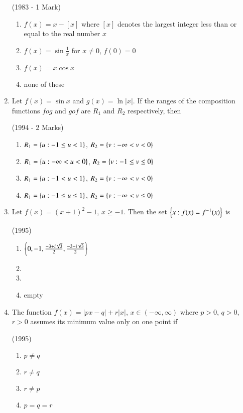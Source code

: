 \documentclass[journal,12pt,twocolumn]{IEEEtran}
\theoremstyle{remark}
\begin{document}
\begin{enumerate}
\hfill{(1983 - 1 Mark)}

\begin{enumerate}
\item $f(x)=x-\left[x\right]$ where $\left[x\right]$ denotes the largest integer less than or equal to the real number $x$
\item $f(x)=\sin{\frac{1}{x}}$ for $x\neq0$, $f(0)=0$
\item $f(x)=x\cos{x}$
\item none of these
\end{enumerate}

\item Let $f(x)=\sin{x}$ and $g(x)=\ln{|x|}$. If the ranges of the composition functions $fog$ and $gof$ are $R_1$ and $R_2$ respectively, then 

\hfill{(1994 - 2 Marks)}

\begin{enumerate}
\item $R_1=\left\{u:-1\le u<1\right\}$, $R_2=\left\{v:-\infty<v<0\right\}$
\item $R_1=\left\{u:-\infty<u<0\right\}$, $R_2=\left\{v:-1\le v\le0\right\}$
\item $R_1=\left\{u:-1<u<1\right\}$, $R_2=\left\{v:-\infty<v<0\right\}$
\item $R_1=\left\{u:-1\le u\le1\right\}$, $R_2=\left\{v:-\infty<v\le0\right\}$
\end{enumerate}

\item Let $f(x)=(x+1)^{2}-1$, $x\ge-1$. Then the set $\left\{x:f(x)=f^{-1}(x)\right\}$ is

\hfill{(1995)}

\begin{enumerate}
\item $\left\{0, -1, \frac{-3+i\sqrt{3}}{2}, \frac{-3-i\sqrt{3}}{2}\right\}$
\item {}
\item {}
\item empty
\end{enumerate}

\item The function $f(x)=|px-q|+r|x|$, $x\in(-\infty,\infty)$ where $p>0$, $q>0$, $r>0$ assumes its minimum value only on one point if

\hfill{(1995)}

\begin{multicols}{2}
	\begin{enumerate}
		\item $p\neq q$
		\item $r\neq q$
		\item $r\neq p$ 
		\item $p=q=r$
	\end{enumerate}
\end{multicols}


\end{enumerate}
\end{document}
